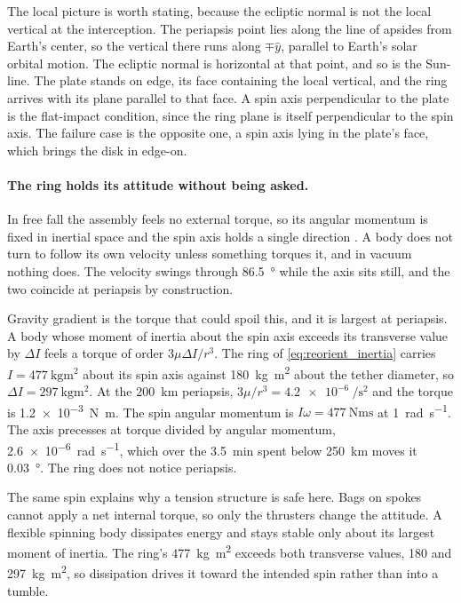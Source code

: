 \documentclass{article}
\begin{document}
The local picture is worth stating, because the ecliptic normal is not the local vertical at the interception. The periapsis point lies along the line of apsides from Earth's center, so the vertical there runs along $\mp\hat{y}$, parallel to Earth's solar orbital motion. The ecliptic normal is horizontal at that point, and so is the Sun-line. The plate stands on edge, its face containing the local vertical, and the ring arrives with its plane parallel to that face. A spin axis perpendicular to the plate is the flat-impact condition, since the ring plane is itself perpendicular to the spin axis. The failure case is the opposite one, a spin axis lying in the plate's face, which brings the disk in edge-on.

\paragraph{The ring holds its attitude without being asked.}
In free fall the assembly feels no external torque, so its angular momentum is fixed in inertial space and the spin axis holds a single direction \cite{wertz1978attitude}. A body does not turn to follow its own velocity unless something torques it, and in vacuum nothing does. The velocity swings through \SI{86.5}{\degree} while the axis sits still, and the two coincide at periapsis by construction.

Gravity gradient is the torque that could spoil this, and it is largest at periapsis. A body whose moment of inertia about the spin axis exceeds its transverse value by $\Delta I$ feels a torque of order $3\mu \Delta I / r^{3}$. The ring of \autoref{eq:reorient_inertia} carries $I = \SI{477}{\kilo\gram\meter\squared}$ about its spin axis against \SI{180}{\kilo\gram\meter\squared} about the tether diameter, so $\Delta I = \SI{297}{\kilo\gram\meter\squared}$. At the \SI{200}{\kilo\meter} periapsis, $3\mu/r^{3} = \SI{4.2e-6}{\per\second\squared}$ and the torque is \SI{1.2e-3}{\newton\meter}. The spin angular momentum is $I\omega = \SI{477}{\newton\meter\second}$ at \SI{1}{\radian\per\second}. The axis precesses at torque divided by angular momentum, \SI{2.6e-6}{\radian\per\second}, which over the \SI{3.5}{\minute} spent below \SI{250}{\kilo\meter} moves it \SI{0.03}{\degree}. The ring does not notice periapsis.

The same spin explains why a tension structure is safe here. Bags on spokes cannot apply a net internal torque, so only the thrusters change the attitude. A flexible spinning body dissipates energy and stays stable only about its largest moment of inertia. The ring's \SI{477}{\kilo\gram\meter\squared} exceeds both transverse values, \SI{180}{} and \SI{297}{\kilo\gram\meter\squared}, so dissipation drives it toward the intended spin rather than into a tumble.
\end{document}
